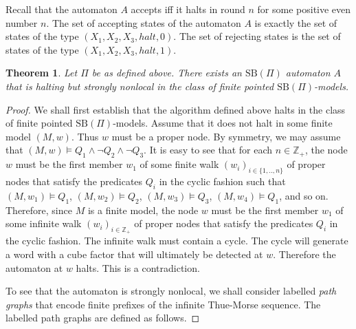\documentclass[copyright,creativecommons]{eptcs}
\newtheorem{theorem}{Theorem}[section]
\begin{document}
Recall that the automaton $A$ accepts iff it halts in round $n$ for
some positive even number $n$.
The set of accepting states of the automaton $A$ is exactly the set
of states of the type $(X_1,X_2,X_3,\mathit{halt},0)$.
The set of rejecting states is the set
of states of the type $(X_1,X_2,X_3,\mathit{halt},1)$.




\begin{theorem}\label{secondmain}
Let $\Pi$ be as defined above.
There exists an $\mathrm{SB}(\Pi)$ automaton $A$ that is halting but
strongly nonlocal in the class of finite pointed $\mathrm{SB}(\Pi)$-models.
\end{theorem}
\begin{proof}
We shall first establish that the algorithm defined above halts in the class of finite pointed
$\mathrm{SB}(\Pi)$-models.
Assume that it does not halt in some finite model $(M,w)$.
Thus $w$ must be a proper node.
By symmetry, we may assume that $(M,w)\models Q_1\wedge \neg Q_2\wedge \neg Q_3$.
It is easy to see that for each $n\in\mathbb{Z}_+$, the node $w$ must be the first member $w_1$ of
some finite walk $(w_i)_{i\in\{1,..,n\}}$ of proper nodes that satisfy the predicates $Q_i$
in the cyclic fashion such that
$(M,w_1)\models Q_1$, $(M,w_2)\models Q_2$, $(M,w_3)\models Q_3$,
$(M,w_4)\models Q_1$,
and so on.
Therefore, since $M$ is a finite model,  the node $w$ must be the first member $w_1$ of
some infinite walk $(w_i)_{i\in\mathbb{Z}_+}$ of proper nodes that satisfy the predicates $Q_i$ in
the cyclic fashion. The infinite walk must contain a cycle.
The cycle will generate a word with a cube factor that will ultimately be detected at $w$.
Therefore the automaton at $w$ halts. This is a contradiction.




To see that the automaton is strongly nonlocal, we shall consider labelled \emph{path graphs}
that encode finite prefixes of the infinite Thue-Morse sequence.
The labelled path graphs are defined as follows.





\end{proof}
\end{document}
